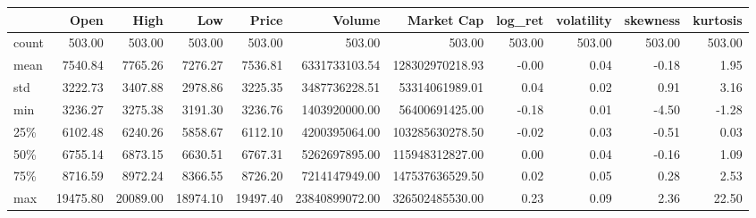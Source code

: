 \begin{tabular}{lrrrrrrrrrr}
\toprule
{} &     Open &     High &      Low &    Price &         Volume &      Market Cap &  log\_ret &  volatility &  skewness &  kurtosis \\
\midrule
count &   503.00 &   503.00 &   503.00 &   503.00 &         503.00 &          503.00 &   503.00 &      503.00 &    503.00 &    503.00 \\
mean  &  7540.84 &  7765.26 &  7276.27 &  7536.81 &  6331733103.54 & 128302970218.93 &    -0.00 &        0.04 &     -0.18 &      1.95 \\
std   &  3222.73 &  3407.88 &  2978.86 &  3225.35 &  3487736228.51 &  53314061989.01 &     0.04 &        0.02 &      0.91 &      3.16 \\
min   &  3236.27 &  3275.38 &  3191.30 &  3236.76 &  1403920000.00 &  56400691425.00 &    -0.18 &        0.01 &     -4.50 &     -1.28 \\
25\%   &  6102.48 &  6240.26 &  5858.67 &  6112.10 &  4200395064.00 & 103285630278.50 &    -0.02 &        0.03 &     -0.51 &      0.03 \\
50\%   &  6755.14 &  6873.15 &  6630.51 &  6767.31 &  5262697895.00 & 115948312827.00 &     0.00 &        0.04 &     -0.16 &      1.09 \\
75\%   &  8716.59 &  8972.24 &  8366.55 &  8726.20 &  7214147949.00 & 147537636529.50 &     0.02 &        0.05 &      0.28 &      2.53 \\
max   & 19475.80 & 20089.00 & 18974.10 & 19497.40 & 23840899072.00 & 326502485530.00 &     0.23 &        0.09 &      2.36 &     22.50 \\
\bottomrule
\end{tabular}
